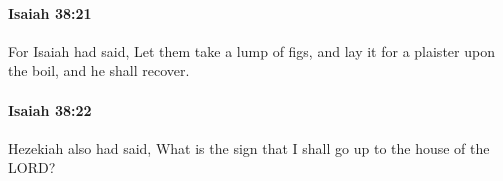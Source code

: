 		\paragraph{Isaiah 38:21} %
			\label{ISAIAH-38-21}

			For Isaiah had said, Let them take a lump of figs, and lay it for a plaister upon the boil, and he shall recover.


		\paragraph{Isaiah 38:22} %
			\label{ISAIAH-38-22}

			Hezekiah also had said, What is the sign that I shall go up to the house of the LORD?

